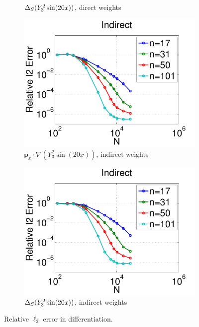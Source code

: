 \begin{figure}
\begin{subfigure}[t]{0.48\textwidth}
	\caption{$\Delta_S ( Y_{3}^{2} \sin(20 x) )$, direct weights}
			\label{fig:direct_vs_indirect_relative_error_lsfc_direct}
    \end{subfigure}
    	\begin{subfigure}[t]{0.48\textwidth}
	\includegraphics[width=1.0\textwidth]{../figures/appendices/direct_vs_indirect_weights/compare_weight_generation/xsfc_vs_xsfc_alt_on_sph32_times_sine_20x/indirect_rel_l2_error-eps-converted-to.pdf}
	\caption{$\mathbf{p}_{x} \cdot \nabla ( Y_{3}^{2} \sin(20 x))$, indirect weights}
		\label{fig:direct_vs_indirect_relative_error_xsfc_indirect}
	\end{subfigure}
	\begin{subfigure}[t]{0.48\textwidth}
	\includegraphics[width=1.0\textwidth]{../figures/appendices/direct_vs_indirect_weights/compare_weight_generation/lsfc_vs_px_grad_dot_px_grad/indirect_rel_l2_error-eps-converted-to.pdf}
	\caption{$\Delta_S ( Y_{3}^{2} \sin(20 x) )$, indirect weights}
		\label{fig:direct_vs_indirect_relative_error_lsfc_indirect}
    \end{subfigure}
	\caption{Relative $\ell_{2}$ error in differentiation.}
	\label{fig:direct_vs_indirect_relative_error}
\end{figure}

